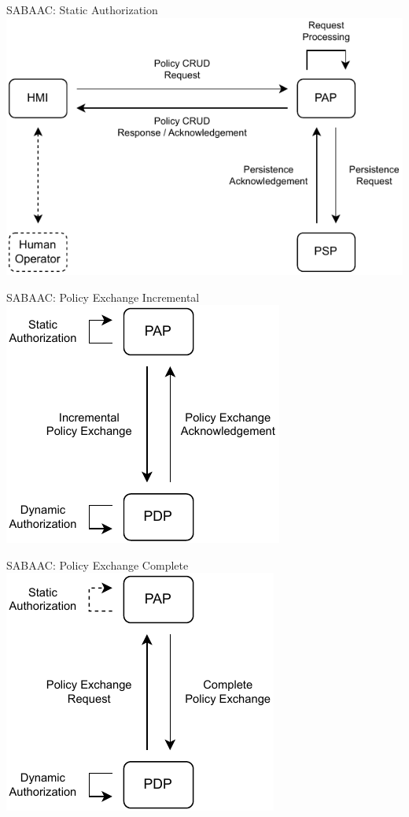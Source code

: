 \documentclass[en]{sdqbeamer}
\begin{document}
\begin{frame}{SABAAC: Static Authorization}
    \centering
    \includegraphics[height=0.75\textheight]{./figures/SABAAC_protocols_authorization_static.drawio.pdf}
\end{frame}
\begin{frame}{SABAAC: Policy Exchange Incremental}
    \centering
    \includegraphics[height=0.75\textheight]{figures/SABAAC_protocols_authorization_dynamic_policyexchange_incremental.drawio.pdf}
\end{frame}
\begin{frame}{SABAAC: Policy Exchange Complete}
    \centering
    \includegraphics[height=0.75\textheight]{figures/SABAAC_protocols_authorization_dynamic_policyexchange_complete.drawio.pdf}
\end{frame}
\end{document}
